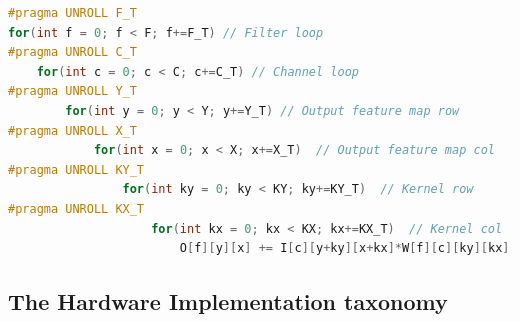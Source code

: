 \begin{minipage}{\linewidth}
    \begin{lstlisting}[language=C, caption=Convolution implemented as nested loops, label={lst:conv_loop}]
#pragma UNROLL F_T
for(int f = 0; f < F; f+=F_T) // Filter loop
#pragma UNROLL C_T
    for(int c = 0; c < C; c+=C_T) // Channel loop
#pragma UNROLL Y_T
        for(int y = 0; y < Y; y+=Y_T) // Output feature map row
#pragma UNROLL X_T
            for(int x = 0; x < X; x+=X_T)  // Output feature map col
#pragma UNROLL KY_T
                for(int ky = 0; ky < KY; ky+=KY_T)  // Kernel row
#pragma UNROLL KX_T
                    for(int kx = 0; kx < KX; kx+=KX_T)  // Kernel col
                        O[f][y][x] += I[c][y+ky][x+kx]*W[f][c][ky][kx];
    \end{lstlisting}
\end{minipage}

\subsection{The Hardware Implementation taxonomy}

